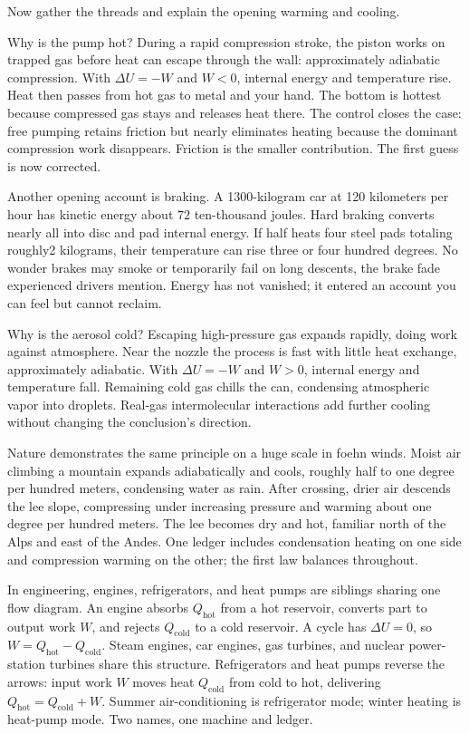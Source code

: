 
\begin{mainline}
Now gather the threads and explain the opening warming and cooling.

Why is the pump hot? During a rapid compression stroke, the piston works on trapped gas before heat can escape through the wall: approximately adiabatic compression. With \(\Delta U=-W\) and \(W<0\), internal energy and temperature rise. Heat then passes from hot gas to metal and your hand. The bottom is hottest because compressed gas stays and releases heat there. The control closes the case: free pumping retains friction but nearly eliminates heating because the dominant compression work disappears. Friction is the smaller contribution. The first guess is now corrected.

Another opening account is braking. A 1300-kilogram car at 120 kilometers per hour has kinetic energy about \(72\) ten-thousand joules. Hard braking converts nearly all into disc and pad internal energy. If half heats four steel pads totaling roughly2 kilograms, their temperature can rise three or four hundred degrees. No wonder brakes may smoke or temporarily fail on long descents, the brake fade experienced drivers mention. Energy has not vanished; it entered an account you can feel but cannot reclaim.

Why is the aerosol cold? Escaping high-pressure gas expands rapidly, doing work against atmosphere. Near the nozzle the process is fast with little heat exchange, approximately adiabatic. With \(\Delta U=-W\) and \(W>0\), internal energy and temperature fall. Remaining cold gas chills the can, condensing atmospheric vapor into droplets. Real-gas intermolecular interactions add further cooling without changing the conclusion's direction.

Nature demonstrates the same principle on a huge scale in foehn winds. Moist air climbing a mountain expands adiabatically and cools, roughly half to one degree per hundred meters, condensing water as rain. After crossing, drier air descends the lee slope, compressing under increasing pressure and warming about one degree per hundred meters. The lee becomes dry and hot, familiar north of the Alps and east of the Andes. One ledger includes condensation heating on one side and compression warming on the other; the first law balances throughout.

In engineering, engines, refrigerators, and heat pumps are siblings sharing one flow diagram. An engine absorbs \(Q_{\text{hot}}\) from a hot reservoir, converts part to output work \(W\), and rejects \(Q_{\text{cold}}\) to a cold reservoir. A cycle has \(\Delta U=0\), so \(W=Q_{\text{hot}}-Q_{\text{cold}}\). Steam engines, car engines, gas turbines, and nuclear power-station turbines share this structure. Refrigerators and heat pumps reverse the arrows: input work \(W\) moves heat \(Q_{\text{cold}}\) from cold to hot, delivering \(Q_{\text{hot}}=Q_{\text{cold}}+W\). Summer air-conditioning is refrigerator mode; winter heating is heat-pump mode. Two names, one machine and ledger.
\end{mainline}

